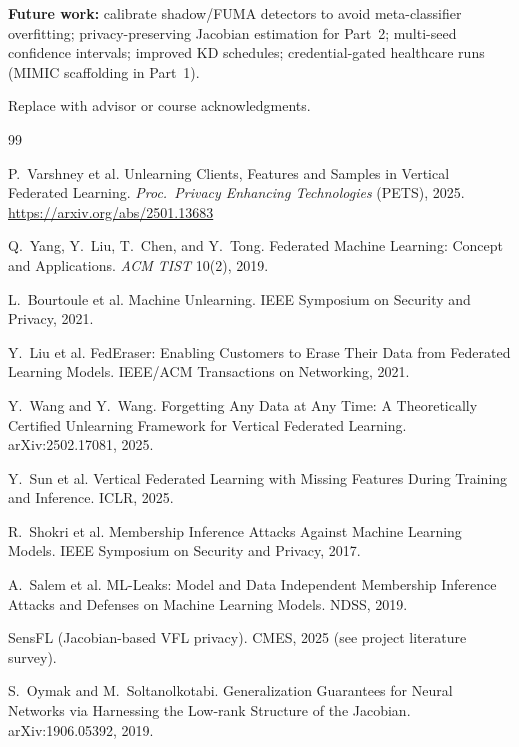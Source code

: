 \documentclass[sigconf,nonacm]{acmart}
\begin{document}
\textbf{Future work:} calibrate shadow/FUMA detectors to avoid meta-classifier overfitting; privacy-preserving Jacobian estimation for Part~2; multi-seed confidence intervals; improved KD schedules; credential-gated healthcare runs (MIMIC scaffolding in Part~1).

\begin{acks}
Replace with advisor or course acknowledgments.
\end{acks}


\begin{thebibliography}{99}

P.~Varshney et al.
\newblock Unlearning Clients, Features and Samples in Vertical Federated Learning.
\newblock \emph{Proc.\ Privacy Enhancing Technologies} (PETS), 2025.
\newblock \url{https://arxiv.org/abs/2501.13683}

Q.~Yang, Y.~Liu, T.~Chen, and Y.~Tong.
\newblock Federated Machine Learning: Concept and Applications.
\newblock \emph{ACM TIST} 10(2), 2019.

L.~Bourtoule et al.
\newblock Machine Unlearning.
\newblock IEEE Symposium on Security and Privacy, 2021.

Y.~Liu et al.
\newblock FedEraser: Enabling Customers to Erase Their Data from Federated Learning Models.
\newblock IEEE/ACM Transactions on Networking, 2021.

Y.~Wang and Y.~Wang.
\newblock Forgetting Any Data at Any Time: A Theoretically Certified Unlearning Framework for Vertical Federated Learning.
\newblock arXiv:2502.17081, 2025.

Y.~Sun et al.
\newblock Vertical Federated Learning with Missing Features During Training and Inference.
\newblock ICLR, 2025.

R.~Shokri et al.
\newblock Membership Inference Attacks Against Machine Learning Models.
\newblock IEEE Symposium on Security and Privacy, 2017.

A.~Salem et al.
\newblock ML-Leaks: Model and Data Independent Membership Inference Attacks and Defenses on Machine Learning Models.
\newblock NDSS, 2019.

SensFL (Jacobian-based VFL privacy).
\newblock CMES, 2025 (see project literature survey).

S.~Oymak and M.~Soltanolkotabi.
\newblock Generalization Guarantees for Neural Networks via Harnessing the Low-rank Structure of the Jacobian.
\newblock arXiv:1906.05392, 2019.


\end{thebibliography}
\end{document}

